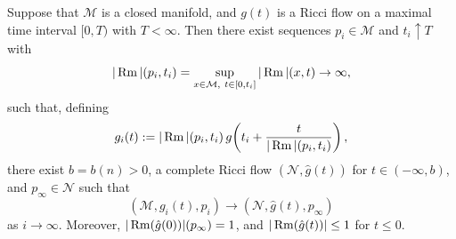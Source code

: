 \begin{theorem}
\label{topping-ch8-blow-up-singularities}
Suppose that $\mathcal M$ is a closed manifold, and $g(t)$ is a Ricci flow on
a maximal time interval $[0,T)$ with $T < \infty$. Then there exist sequences
$p_i \in \mathcal M$ and $t_i \uparrow T$ with
\[
|\operatorname{Rm}|(p_i,t_i) = \sup_{x \in \mathcal M,\ t \in [0,t_i]} |\operatorname{Rm}|(x,t) \to \infty,
\]
such that, defining
\[
g_i(t) := |\operatorname{Rm}|(p_i,t_i)\, g\!\left(t_i + \frac{t}{|\operatorname{Rm}|(p_i,t_i)}\right),
\]
there exist $b = b(n) > 0$, a complete Ricci flow $(\mathcal N,\hat g(t))$
for $t \in (-\infty,b)$, and $p_\infty \in \mathcal N$ such that
\[
(\mathcal M,g_i(t),p_i) \to (\mathcal N,\hat g(t),p_\infty)
\]
as $i \to \infty$. Moreover, $|\operatorname{Rm}(\hat g(0))|(p_\infty)=1$, and
$|\operatorname{Rm}(\hat g(t))| \le 1$ for $t \le 0$.
\end{theorem}

